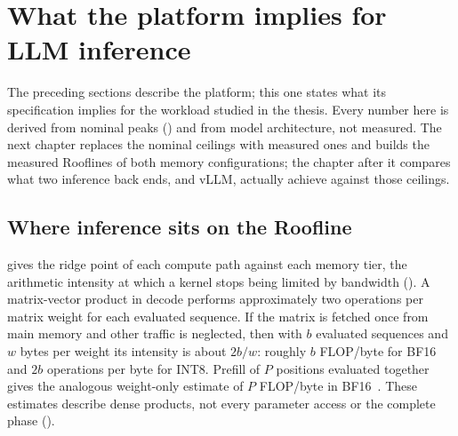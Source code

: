 
\section{What the platform implies for LLM inference}
\label{sec:platform-llm}

The preceding sections describe the platform; this one states what its
specification implies for the workload studied in the thesis.  Every
number here is derived from nominal peaks ()
and from model architecture, not measured.  The next chapter replaces the
nominal ceilings with measured ones and builds the measured Rooflines of
both memory configurations; the chapter after it compares what two
inference back ends, \lcpp{} and vLLM, actually achieve against those
ceilings.

\subsection{Where inference sits on the Roofline}
\label{sec:platform-nominal-roofline}

 gives the ridge point of each compute path
against each memory tier, the arithmetic intensity at which a kernel stops
being limited by bandwidth ().  A matrix-vector
product in decode performs approximately two operations per matrix
weight for each evaluated sequence.  If the matrix is fetched once
from main memory and other traffic is neglected, then with \(b\)
evaluated sequences and \(w\) bytes per weight its intensity is about
\(2b/w\): roughly \(b\) FLOP/byte for BF16 and \(2b\) operations per
byte for INT8.  Prefill of \(P\) positions evaluated together gives the
analogous weight-only estimate of \(P\) FLOP/byte in BF16~\cite{na2024llmcpu}.
These estimates describe dense products, not every parameter access or
the complete phase ().

